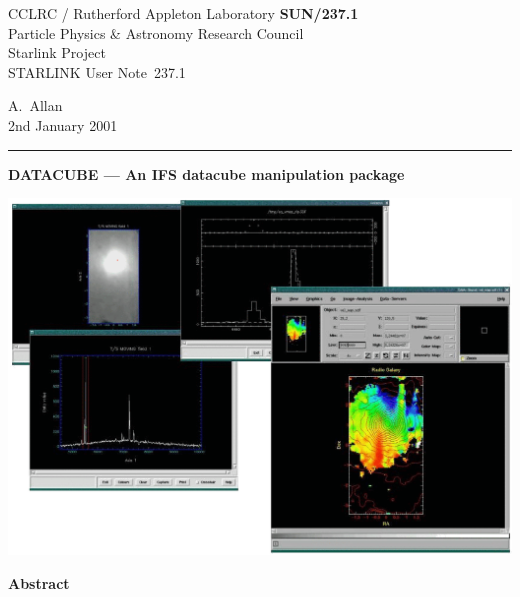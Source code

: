 \documentclass[twoside,11pt]{article}
\newcommand{\stardoccategory}  {STARLINK User Note}
\newcommand{\stardocinitials}  {SUN}
\newcommand{\stardocnumber}    {237.1}
\newcommand{\stardocauthors}   {A.~Allan}
\newcommand{\stardocdate}      {2nd January 2001}
\newcommand{\stardoctitle}     {DATACUBE --- An IFS datacube manipulation package}
\newcommand{\stardocname}{\stardocinitials /\stardocnumber}
\newenvironment{latexonly}{}{}
\begin{document}
\thispagestyle{empty}

\begin{latexonly}
   CCLRC / {\sc Rutherford Appleton Laboratory} \hfill {\bf \stardocname}\\
   {\large Particle Physics \& Astronomy Research Council}\\
   {\large Starlink Project\\}
   {\large \stardoccategory\ \stardocnumber}
   \begin{flushright}
   \stardocauthors\\
   \stardocdate
   \end{flushright}
   \vspace{-4mm}
   \rule{\textwidth}{0.5mm}
   \vspace{5mm}
   \begin{center}
   {\Huge\bf  \stardoctitle \\ [2.5ex]}
   \end{center}
   \vspace{5mm}

   \begin{center}
   \includegraphics[scale=0.6]{sun237_cover.eps}
   \end{center}

   \vspace{5mm}
   \begin{center}
      {\Large\bf Abstract}
   \end{center}
\end{latexonly}
\end{document}
